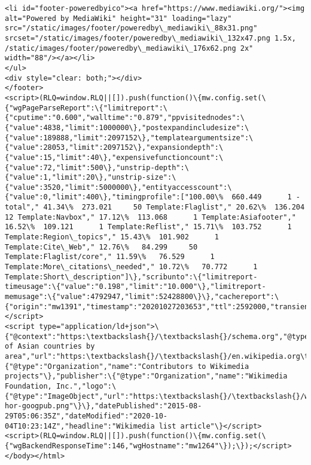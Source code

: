 \documentclass[11pt]{article}
\begin{document}
\begin{Verbatim}[commandchars=\\\{\}]
<li id="footer-poweredbyico"><a href="https://www.mediawiki.org/"><img alt="Powered by MediaWiki" height="31" loading="lazy" src="/static/images/footer/poweredby\_mediawiki\_88x31.png" srcset="/static/images/footer/poweredby\_mediawiki\_132x47.png 1.5x, /static/images/footer/poweredby\_mediawiki\_176x62.png 2x" width="88"/></a></li>
</ul>
<div style="clear: both;"></div>
</footer>
<script>(RLQ=window.RLQ||[]).push(function()\{mw.config.set(\{"wgPageParseReport":\{"limitreport":\{"cputime":"0.600","walltime":"0.879","ppvisitednodes":\{"value":4838,"limit":1000000\},"postexpandincludesize":\{"value":189888,"limit":2097152\},"templateargumentsize":\{"value":28053,"limit":2097152\},"expansiondepth":\{"value":15,"limit":40\},"expensivefunctioncount":\{"value":72,"limit":500\},"unstrip-depth":\{"value":1,"limit":20\},"unstrip-size":\{"value":3520,"limit":5000000\},"entityaccesscount":\{"value":0,"limit":400\},"timingprofile":["100.00\%  660.449      1 -total"," 41.34\%  273.021     50 Template:Flaglist"," 20.62\%  136.204     12 Template:Navbox"," 17.12\%  113.068      1 Template:Asiafooter"," 16.52\%  109.121      1 Template:Reflist"," 15.71\%  103.752      1 Template:Region\_topics"," 15.43\%  101.902      1 Template:Cite\_Web"," 12.76\%   84.299     50 Template:Flaglist/core"," 11.59\%   76.529      1 Template:More\_citations\_needed"," 10.72\%   70.772      1 Template:Short\_description"]\},"scribunto":\{"limitreport-timeusage":\{"value":"0.198","limit":"10.000"\},"limitreport-memusage":\{"value":4792947,"limit":52428800\}\},"cachereport":\{"origin":"mw1391","timestamp":"20201027203653","ttl":2592000,"transientcontent":false\}\}\});\});</script>
<script type="application/ld+json">\{"@context":"https:\textbackslash{}/\textbackslash{}/schema.org","@type":"Article","name":"List of Asian countries by area","url":"https:\textbackslash{}/\textbackslash{}/en.wikipedia.org\textbackslash{}/wiki\textbackslash{}/List\_of\_Asian\_countries\_by\_area","sameAs":"http:\textbackslash{}/\textbackslash{}/www.wikidata.org\textbackslash{}/entity\textbackslash{}/Q20983969","mainEntity":"http:\textbackslash{}/\textbackslash{}/www.wikidata.org\textbackslash{}/entity\textbackslash{}/Q20983969","author":\{"@type":"Organization","name":"Contributors to Wikimedia projects"\},"publisher":\{"@type":"Organization","name":"Wikimedia Foundation, Inc.","logo":\{"@type":"ImageObject","url":"https:\textbackslash{}/\textbackslash{}/www.wikimedia.org\textbackslash{}/static\textbackslash{}/images\textbackslash{}/wmf-hor-googpub.png"\}\},"datePublished":"2015-08-29T05:06:35Z","dateModified":"2020-10-04T10:23:14Z","headline":"Wikimedia list article"\}</script>
<script>(RLQ=window.RLQ||[]).push(function()\{mw.config.set(\{"wgBackendResponseTime":146,"wgHostname":"mw1264"\});\});</script>
</body></html>

    \end{Verbatim}
\end{document}
